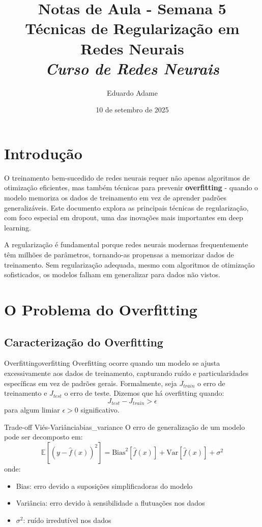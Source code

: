 \documentclass[a4paper,12pt]{article}
\title{Notas de Aula - Semana 5 \\
       \large Técnicas de Regularização em Redes Neurais\\
       \itshape Curso de Redes Neurais}
\author{Eduardo Adame}
\date{10 de setembro de 2025}
\newcommand{\highlight}[1]{{\color{nes_dark_orange}\textbf{#1}}}
\begin{document}
\maketitle

\tableofcontents
\newpage

\section{Introdução}

O treinamento bem-sucedido de redes neurais requer não apenas algoritmos de otimização eficientes, mas também técnicas para prevenir \highlight{overfitting} - quando o modelo memoriza os dados de treinamento em vez de aprender padrões generalizáveis. Este documento explora as principais técnicas de regularização, com foco especial em dropout, uma das inovações mais importantes em deep learning.

A regularização é fundamental porque redes neurais modernas frequentemente têm milhões de parâmetros, tornando-as propensas a memorizar dados de treinamento. Sem regularização adequada, mesmo com algoritmos de otimização sofisticados, os modelos falham em generalizar para dados não vistos.

\section{O Problema do Overfitting}

\subsection{Caracterização do Overfitting}

\begin{definicao}{Overfitting}{overfitting}
Overfitting ocorre quando um modelo se ajusta excessivamente aos dados de treinamento, capturando ruído e particularidades específicas em vez de padrões gerais. Formalmente, seja $J_{train}$ o erro de treinamento e $J_{test}$ o erro de teste. Dizemos que há overfitting quando:
\[
J_{test} - J_{train} > \epsilon
\]
para algum limiar $\epsilon > 0$ significativo.
\end{definicao}

\begin{teorema}{Trade-off Viés-Variância}{bias_variance}
O erro de generalização de um modelo pode ser decomposto em:
\[
\mathbb{E}[(y - \hat{f}(x))^2] = \text{Bias}^2[\hat{f}(x)] + \text{Var}[\hat{f}(x)] + \sigma^2
\]
onde:
\begin{itemize}
    \item Bias: erro devido a suposições simplificadoras do modelo
    \item Variância: erro devido à sensibilidade a flutuações nos dados
    \item $\sigma^2$: ruído irredutível nos dados
\end{itemize}
\end{teorema}
\end{document}

